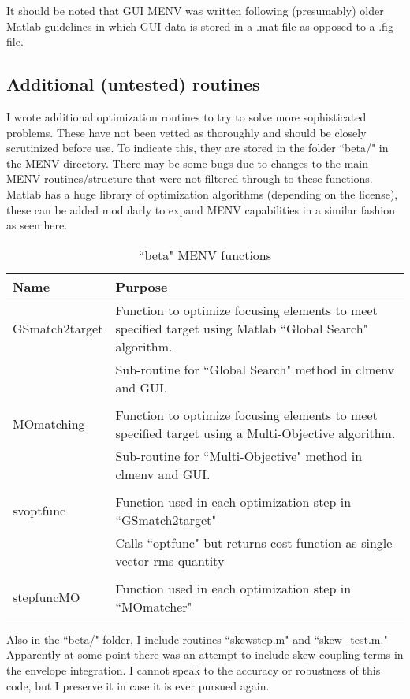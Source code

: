 \documentclass[../menv_main.tex]{subfiles}
\begin{document}
It should be noted that GUI MENV was written following (presumably) older Matlab guidelines in which GUI data is stored in a .mat file as opposed to a .fig file.

\subsection{Additional (untested) routines}
I wrote additional optimization routines to try to solve more sophisticated problems. These have not been vetted as thoroughly and should be closely scrutinized before use. To indicate this, they are stored in the folder ``beta/" in the MENV directory. There may be some bugs due to changes to the main MENV routines/structure that were not filtered through to these functions. Matlab has a huge library of optimization algorithms (depending on the license), these can be added modularly to expand MENV capabilities in a similar fashion as seen here.

\begin{table}[htb]
\centering
\caption{``beta" MENV functions}
\label{tab:menv-beta}
\vspace{10pt}
\begin{tabularx}{\textwidth}{l X}
\hline
 Name & Purpose \\
\hline
GSmatch2target& Function to optimize focusing elements to meet specified target using Matlab ``Global Search" algorithm. \\
			& Sub-routine for ``Global Search" method in clmenv and GUI. \\ &\\
MOmatching	& Function to optimize focusing elements to meet specified target using a Multi-Objective algorithm.\\
			& Sub-routine for ``Multi-Objective" method in clmenv and GUI. \\&\\
svoptfunc 	& Function used in each optimization step in ``GSmatch2target" \\
			& Calls ``optfunc" but returns cost function as single-vector rms quantity \\&\\
stepfuncMO 	& Function used in each optimization step in ``MOmatcher" \\
\hline
\end{tabularx}
\end{table}

Also in the ``beta/" folder, I include routines ``skewstep.m" and ``skew\_test.m." Apparently at some point there was an attempt to include skew-coupling terms in the envelope integration. I cannot speak to the accuracy or robustness of this code, but I preserve it in case it is ever pursued again. 
\end{document}
